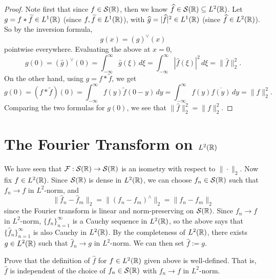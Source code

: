 \begin{proof}
  Note first that since $f \in \mathcal{S}(\mathbb{R})$, then
  we know $\widehat{f} \in \mathcal{S}(\mathbb{R}) \subseteq L^2(\mathbb{R})$.
  Let $g = f * \widetilde{f} \in L^1(\mathbb{R})$
  (since $f, \widetilde{f} \in L^1(\mathbb{R})$),
  with $\widehat{g} = |\widehat{f}|^2 \in L^1(\mathbb{R})$
  (since $\widehat{f} \in L^2(\mathbb{R})$).
  So by the inversion formula,
  \[
    g(x) = (\widehat{g})^\vee(x)
  \]
  pointwise everywhere. Evaluating the above at $x = 0$,
  \[
    g(0) = (\widehat{g})^\vee(0)
    = \int_{-\infty}^\infty \widehat{g}(\xi)\, d\xi
    = \int_{-\infty}^\infty |\widehat{f}(\xi)|^2\, d\xi
    = \|\widehat{f}\|_2^2.
  \]
  On the other hand, using
  $g = f * \widetilde{f}$, we get
  \[
    g(0) = (f * \widetilde{f})(0)
    = \int_{-\infty}^\infty f(y) \widetilde{f}(0 - y)\, dy
    = \int_{-\infty}^\infty f(y) \overline{f(y)}\, dy
    = \|f\|_2^2.
  \]
  Comparing the two formulas for $g(0)$, we
  see that $\|\widehat{f}\|_2^2 = \|f\|_2^2$.
\end{proof}

\section{The Fourier Transform on \texorpdfstring{$L^2(\mathbb{R})$}{L2(R)}}

\begin{remark}
  We have seen that
  $\mathcal{F} : \mathcal{S}(\mathbb{R}) \to \mathcal{S}(\mathbb{R})$
  is an isometry with respect to $\|\cdot\|_2$. Now
  fix $f \in L^2(\mathbb{R})$. Since
  $\mathcal{S}(\mathbb{R})$ is dense in $L^2(\mathbb{R})$, we
  can choose $f_n \in \mathcal{S}(\mathbb{R})$ such that
  $f_n \to f$ in $L^2$-norm, and
  \[
    \|\widehat{f}_n - \widehat{f}_m\|_2
    = \|(f_n - f_m)^\wedge\|_2
    = \|f_n - f_m\|_2
  \]
  since the Fourier transform is linear and
  norm-preserving on $\mathcal{S}(\mathbb{R})$.
  Since $f_n \to f$ in $L^2$-norm,
  $\{f_n\}_{n = 1}^\infty$
  is a Cauchy sequence in $L^2(\mathbb{R})$, so the above
  says that $\{\widehat{f}_n\}_{n = 1}^\infty$
  is also Cauchy in $L^2(\mathbb{R})$. By the completeness
  of $L^2(\mathbb{R})$, there exists
  $g \in L^2(\mathbb{R})$ such that $\widehat{f}_n \to g$
  in $L^2$-norm. We can then set
  $\widehat{f} := g$.
\end{remark}

\begin{exercise}
  Prove that the definition of $\widehat{f}$ for
  $f \in L^2(\mathbb{R})$ given above is well-defined. That is,
  $\widehat{f}$ is independent of the
  choice of $f_n \in \mathcal{S}(\mathbb{R})$ with
  $f_n \to f$ in $L^2$-norm.
\end{exercise}


